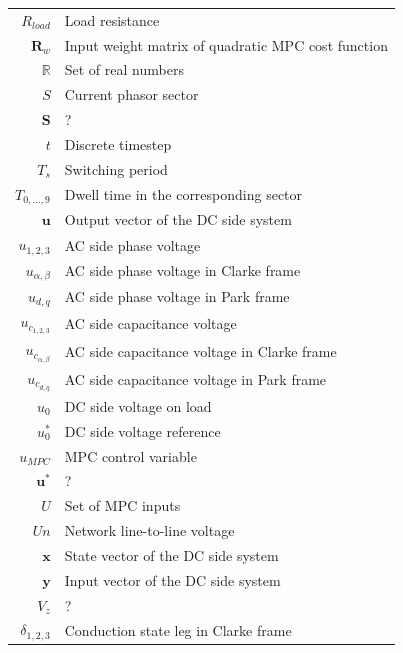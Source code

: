 \begin{scriptsize}
\begin{tabularx}{\textwidth}{r|X}
  $R_{load}$                        & Load resistance\\
  $\boldsymbol{R}_w$                & Input weight matrix of quadratic MPC cost function\\
  $\mathbb{R}$                      & Set of real numbers\\
  $S$                               & Current phasor sector\\
  $\boldsymbol{S}$                  & ?\\
  $t$                               & Discrete timestep\\
  $T_s$                             & Switching period\\
  $T_{0,\dots,9}$                   & Dwell time in the corresponding sector\\
  $\boldsymbol{u}$                  & Output vector of the DC side system\\
  $u_{1,2,3}$                       & AC side phase voltage\\
  $u_{\alpha,\beta}$                & AC side phase voltage in Clarke frame\\
  $u_{d,q}$                         & AC side phase voltage in Park frame\\
  $u_{c_{1,2,3}}$                   & AC side capacitance voltage\\
  $u_{c_{\alpha,\beta}}$            & AC side capacitance voltage in Clarke frame\\
  $u_{c_{d,q}}$                     & AC side capacitance voltage in Park frame\\
  $u_0$                             & DC side voltage on load\\
  $u^*_0$                           & DC side voltage reference\\
  $u_{MPC}$                         & MPC control variable\\
  $\boldsymbol{u}^*$                & ?\\
  $U$                               & Set of MPC inputs\\
  $Un$                              & Network line-to-line voltage\\
  $\boldsymbol{x}$                  & State vector of the DC side system\\
  $\boldsymbol{y}$                  & Input vector of the DC side system\\
  $V_z$                             & ?\\
  $\delta_{1,2,3}$                  & Conduction state leg in Clarke frame\\

\end{tabularx}
\end{scriptsize}
